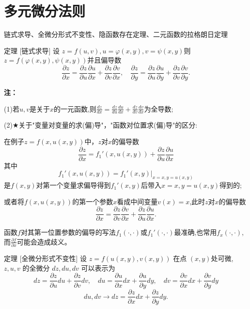 \documentclass[a4paper,12pt,oneside,fontset=none]{ctexbook}
\newcounter{theorem}[chapter]
\newenvironment{theorem}[1][]{\begin{thmBox}{定理}{#1}}{\end{thmBox}}
\newenvironment{note}{
    \par\vspace{0.5em}\noindent
    \textbf{\color{NoteColor} 注：}
}{
    \par\vspace{0.5em}
}
\numberwithin{equation}{chapter}
\begin{document}
\section{多元微分法则}
链式求导、全微分形式不变性、隐函数存在定理、二元函数的拉格朗日定理
\begin{theorem}
    [链式求导]
    设 $z = f(u,v), u=\varphi (x,y), v=\psi (x,y)$则 $z = f(\varphi (x,y), \psi (x,y))$并且偏导数
    $$\frac{\partial z}{\partial x} = \frac{\partial z}{\partial u} \frac{\partial u}{\partial x} + \frac{\partial z}{\partial v} \frac{\partial v}{\partial x},
    \quad \frac{\partial z}{\partial y} = \frac{\partial z}{\partial u} \frac{\partial u}{\partial y} + \frac{\partial z}{\partial v} \frac{\partial v}{\partial y}.$$
\end{theorem}
\begin{note}
    (1)若$u,v$是关于$x$的一元函数,则$\frac{dz}{dx} = \frac{dz}{du} \frac{du}{dx} + \frac{dz}{dv} \frac{dv}{dx}$为全导数;
    
    (2)$\bigstar$关于"变量对变量的求(偏)导"，"函数对位置求(偏)导"的区分:

    在例子$z = f(x, u(x,y))$中，$z$对$x$的偏导数$$\frac{\partial z}{\partial x} = f_{1}'(x,u(x,y)) + \frac{\partial z}{\partial u} \frac{\partial u}{\partial x}$$
    其中$$f_{1}'(x,u(x,y)) = f_{1}'(x,y)|_{x=x, y=u(x,y)}$$是$f(x,y)$对第一个变量求偏导得到$f_1'(x,y)$后带入$x=x,y=u(x,y)$得到的;

    或者将$f(x,u(x,y))$的第一个参数$x$看成中间变量$v(x)=x$,此时$z$对$x$的偏导数$$\frac{\partial z}{\partial x} = \frac{\partial z}{\partial v} \frac{\partial v}{\partial x} + \frac{\partial z}{\partial u} \frac{\partial u}{\partial x}.$$

    函数$f$对其第一位置参数的偏导的写法$f_1(\cdot,\cdot)$或$f_1'(\cdot,\cdot)$最准确,也常用$f_x(\cdot,\cdot)$,而$\frac{\partial f}{\partial x}$可能会造成歧义。
\end{note}

\begin{theorem}
    [全微分形式不变性]
    设 $z = f(u(x,y),v(x,y))$ 在点 $(x,y)$处可微, $z,u,v$ 的全微分 $dz,du,dv$ 可以表示为
    $$dz = \frac{\partial z}{\partial u} du + \frac{\partial z}{\partial v} dv,\quad
    du = \frac{\partial u}{\partial x} dx + \frac{\partial u}{\partial y} dy,\quad
    dv = \frac{\partial v}{\partial x} dx + \frac{\partial v}{\partial y} dy$$
    $$du,dv\rightarrow dz= \frac{\partial z}{\partial x} dx + \frac{\partial z}{\partial y} dy.$$
\end{theorem}
\end{document}
